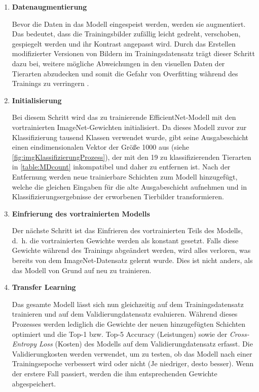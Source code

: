 \begin{enumerate}
	\item \textbf{Datenaugmentierung}
	
	Bevor die Daten in das Modell eingespeist werden, werden sie augmentiert. Das bedeutet, dass die Trainingsbilder zufällig leicht gedreht, verschoben, gespiegelt werden und ihr Kontrast angepasst wird. Durch das Erstellen modifizierter Versionen von Bildern im Trainingsdatensatz trägt dieser Schritt dazu bei, weitere mögliche Abweichungen in den visuellen Daten der Tierarten abzudecken und somit die Gefahr von Overfitting während des Trainings zu verringern \cite{Shorten2019}.
	
	\item \textbf{Initialisierung}
	
	Bei diesem Schritt wird das zu trainierende EfficientNet-Modell mit den vortrainierten ImageNet-Gewichten initialisiert. Da dieses Modell zuvor zur Klassifizierung tausend Klassen verwendet wurde, gibt seine Ausgabeschicht einen eindimensionalen Vektor der Größe 1000 aus (siehe \autoref{fig:imgKlassifizierungProzess}), der mit den 19 zu klassifizierenden Tierarten in \autoref{table:MDcount} inkompatibel und daher zu entfernen ist. Nach der Entfernung werden neue trainierbare Schichten zum Modell hinzugefügt, welche die gleichen Eingaben für die alte Ausgabeschicht aufnehmen und in Klassifizierungsergebnisse der erworbenen Tierbilder transformieren.
	
	\item \textbf{Einfrierung des vortrainierten Modells}
	
	Der nächste Schritt ist das Einfrieren des vortrainierten Teils des Modells, d.~h. die vortrainierten Gewichte werden als konstant gesetzt. Falls diese Gewichte während des Trainings abgeändert werden, wird alles verloren, was bereits von dem ImageNet-Datensatz gelernt wurde. Dies ist nicht anders, als das Modell von Grund auf neu zu trainieren.
	
	\item \textbf{Transfer Learning}
	
	Das gesamte Modell lässt sich nun gleichzeitig auf dem Trainingsdatensatz trainieren und auf dem Validierungdatensatz evaluieren. Während dieses Prozesses werden lediglich die Gewichte der neuen hinzugefügten Schichten optimiert und die Top-1 bzw. Top-5 Accuracy (Leistungen) sowie der \emph{Cross-Entropy Loss} (Kosten) des Modells auf dem Validierungdatensatz erfasst. Die Validierungkosten werden verwendet, um zu testen, ob das Modell nach einer Trainingsepoche verbessert wird oder nicht (Je niedriger, desto besser). Wenn der erstere Fall passiert, werden die ihm entsprechenden Gewichte abgespeichert.
	

\end{enumerate}
